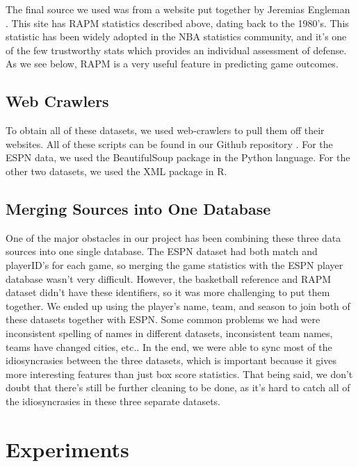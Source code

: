 \documentclass{article} %
\begin{document}
	The final source we used was from a website put together by Jeremias Engleman \cite{rpm_data}. This site has RAPM statistics described above, dating back to the 1980's. This statistic has been widely adopted in the NBA statistics community, and it's one of the few trustworthy stats which provides an individual assessment of defense. As we see below, RAPM is a very useful feature in predicting game outcomes. \\

\subsection{Web Crawlers}
	To obtain all of these datasets, we used web-crawlers to pull them off their websites. All of these scripts can be found in our Github repository \cite{gitrepo}. For the ESPN data, we used the BeautifulSoup package in the Python language. For the other two datasets, we used the XML package in R. \\

	\subsection{Merging Sources into One Database}
	One of the major obstacles in our project has been combining these three data sources into one single database. The ESPN dataset had both match and playerID's for each game, so merging the game statistics with the ESPN player database wasn't very difficult. However, the basketball reference and RAPM dataset didn't have these identifiers, so it was more challenging to put them together. We ended up using the player's name, team, and season to join both of these datasets together with ESPN. Some common problems we had were inconsistent spelling of names in different datasets, inconsistent team names, teams have changed cities, etc.. In the end, we were able to sync most of the idiosyncrasies between the three datasets, which is important because it gives more interesting features than just box score statistics. That being said, we don't doubt that there's still be further cleaning to be done, as it's hard to catch all of the idiosyncrasies in these three separate datasets. \\

\section{Experiments}
\end{document}
